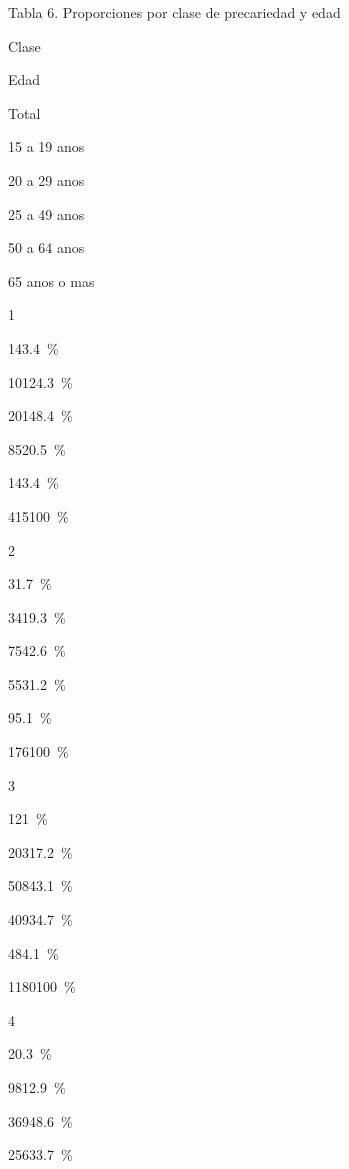 \documentclass[
]{article}
\newenvironment{Shaded}{\begin{snugshade}}{\end{snugshade}}
\newcommand{\AttributeTok}[1]{\textcolor[rgb]{0.77,0.63,0.00}{#1}}
\newcommand{\CommentTok}[1]{\textcolor[rgb]{0.56,0.35,0.01}{\textit{#1}}}
\newcommand{\FunctionTok}[1]{\textcolor[rgb]{0.00,0.00,0.00}{#1}}
\newcommand{\NormalTok}[1]{#1}
\newcommand{\SpecialCharTok}[1]{\textcolor[rgb]{0.00,0.00,0.00}{#1}}
\newcommand{\StringTok}[1]{\textcolor[rgb]{0.31,0.60,0.02}{#1}}
\begin{document}
\begin{Shaded}
\end{Shaded}

Tabla 6. Proporciones por clase de precariedad y edad

Clase

Edad

Total

15 a 19 anos

20 a 29 anos

25 a 49 anos

50 a 64 anos

65 anos o mas

1

{14}{3.4~\%}

{101}{24.3~\%}

{201}{48.4~\%}

{85}{20.5~\%}

{14}{3.4~\%}

{415}{100~\%}

2

{3}{1.7~\%}

{34}{19.3~\%}

{75}{42.6~\%}

{55}{31.2~\%}

{9}{5.1~\%}

{176}{100~\%}

3

{12}{1~\%}

{203}{17.2~\%}

{508}{43.1~\%}

{409}{34.7~\%}

{48}{4.1~\%}

{1180}{100~\%}

4

{2}{0.3~\%}

{98}{12.9~\%}

{369}{48.6~\%}

{256}{33.7~\%}
\end{document}
